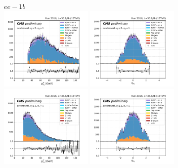 \begin{figure}[ht]
    \centering
    $ee - 1b$ \\
    \includegraphics[width=0.4\textwidth]{chapters/Analysis/sectionPlots/figures/kinematics_pickles/ee/1b/ee_1b_lepton1_pt.pdf}
    \includegraphics[width=0.4\textwidth]{chapters/Analysis/sectionPlots/figures/kinematics_pickles/ee/1b/ee_1b_lepton1_eta.pdf}
    \includegraphics[width=0.4\textwidth]{chapters/Analysis/sectionPlots/figures/kinematics_pickles/ee/1b/ee_1b_lepton2_pt.pdf}
    \includegraphics[width=0.4\textwidth]{chapters/Analysis/sectionPlots/figures/kinematics_pickles/ee/1b/ee_1b_lepton2_eta.pdf}

\end{figure}
